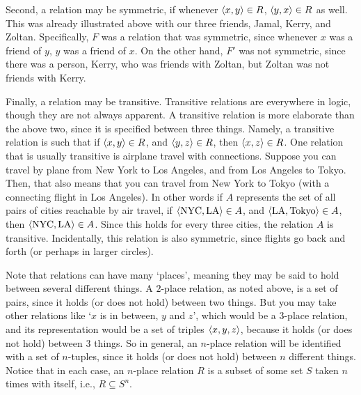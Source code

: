 Second, a relation may be symmetric, if whenever $\langle x, y\rangle \in R$, $\langle y, x\rangle \in R$ as well. This was already illustrated above with our three friends, Jamal, Kerry, and Zoltan. Specifically, $F$ was a relation that was symmetric, since whenever $x$ was a friend of $y$, $y$ was a friend of $x$. On the other hand, $F'$ was not symmetric, since there was a person, Kerry, who was friends with Zoltan, but Zoltan was not friends with Kerry. 

Finally, a relation may be transitive. Transitive relations are everywhere in logic, though they are not always apparent. A transitive relation is more elaborate than the above two, since it is specified between three things. Namely, a transitive relation is such that if $\langle x, y\rangle \in R$, and $\langle y, z\rangle \in R$, then $\langle x, z\rangle \in R$. One relation that is usually transitive is airplane travel with connections. Suppose you can travel by plane from New York to Los Angeles, and from Los Angeles to Tokyo. Then, that also means that you can travel from New York to Tokyo (with a connecting flight in Los Angeles). In other words if $A$ represents the set of all pairs of cities reachable by air travel, if $\langle\text{NYC}, \text{LA}\rangle \in A$, and $\langle\text{LA}, \text{Tokyo}\rangle \in A$, then $\langle\text{NYC}, \text{LA}\rangle \in A$. Since this holds for every three cities, the relation $A$ is transitive. Incidentally, this relation is also symmetric, since flights go back and forth (or perhaps in larger circles).  


Note that relations can have many `places', meaning they may be said to hold between several different things. A $2$-place relation, as noted above, is a set of pairs, since it holds (or does not hold) between two things. But you may take other relations like `$x$ is in between, $y$ and $z$', which would be a $3$-place relation, and its representation would be a set of triples $\langle x, y, z\rangle$, because it holds (or does not hold) between 3 things. So in general, an $n$-place relation will be identified with a set of $n$-tuples, since it holds (or does not hold) between $n$ different things. Notice that in each case, an $n$-place relation $R$ is a subset of some set $S$ taken $n$ times with itself, i.e., $R \subseteq S^n$. 

